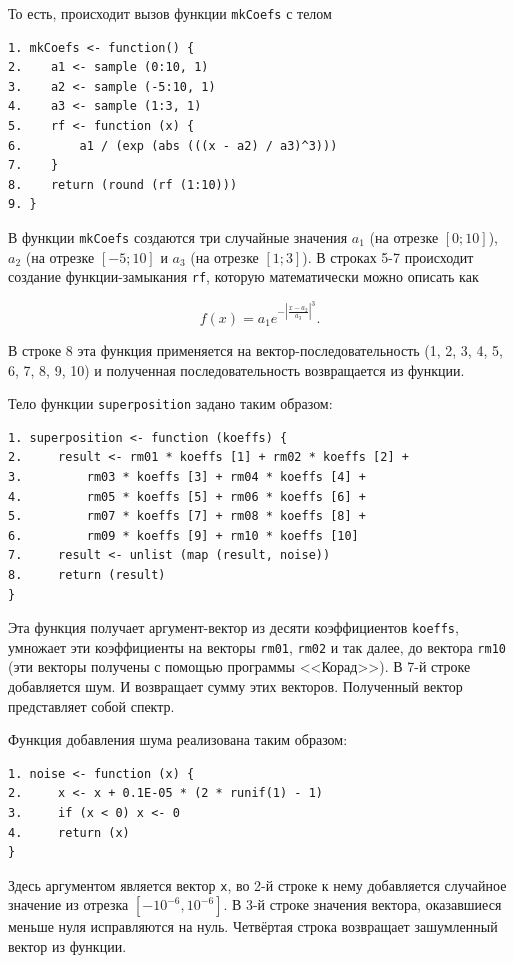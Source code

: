 \documentclass[12pt]{article}
\begin{document}
\begin{enumerate}
  То есть, происходит вызов функции \verb|mkCoefs| с телом

\begin{verbatim}
1. mkCoefs <- function() {
2.    a1 <- sample (0:10, 1)
3.    a2 <- sample (-5:10, 1)
4.    a3 <- sample (1:3, 1)
5.    rf <- function (x) {
6.        a1 / (exp (abs (((x - a2) / a3)^3)))
7.    }
8.    return (round (rf (1:10)))
9. }
\end{verbatim}

  В функции \verb|mkCoefs| создаются три случайные значения $a_1$ (на отрезке $[0; 10]$), $a_2$ (на отрезке $[-5; 10]$ и $a_3$ (на отрезке $[1;3]$). В строках 5-7 происходит создание функции-замыкания \verb|rf|, которую математически можно описать как

  $$f(x) = a_1 e^{- \left | {\frac {x - a_2} {a_3}} \right |^3}.$$

  В строке 8 эта функция применяется на вектор-последовательность (1, 2, 3, 4, 5, 6, 7, 8, 9, 10) и полученная последовательность возвращается из функции.

  Тело функции \verb|superposition| задано таким образом:

\begin{verbatim}
1. superposition <- function (koeffs) {
2.     result <- rm01 * koeffs [1] + rm02 * koeffs [2] +
3.         rm03 * koeffs [3] + rm04 * koeffs [4] +
4.         rm05 * koeffs [5] + rm06 * koeffs [6] +
5.         rm07 * koeffs [7] + rm08 * koeffs [8] +
6.         rm09 * koeffs [9] + rm10 * koeffs [10]
7.     result <- unlist (map (result, noise))
8.     return (result)
}
\end{verbatim}

  Эта функция получает аргумент-вектор из десяти коэффициентов \verb|koeffs|, умножает эти коэффициенты на векторы \verb|rm01|, \verb|rm02| и так далее, до вектора \verb|rm10| (эти векторы получены с помощью программы <<Корад>>). В 7-й строке добавляется шум. И возвращает сумму этих векторов. Полученный вектор представляет собой спектр.

  Функция добавления шума реализована таким образом:

\begin{verbatim}
1. noise <- function (x) {
2.     x <- x + 0.1E-05 * (2 * runif(1) - 1)
3.     if (x < 0) x <- 0
4.     return (x)
}
\end{verbatim}

  Здесь аргументом является вектор \verb|x|, во 2-й строке к нему добавляется случайное значение из отрезка $[-10^{-6}, 10^{-6}]$. В 3-й строке значения вектора, оказавшиеся меньше нуля исправляются на нуль. Четвёртая строка возвращает зашумленный вектор из функции.
  

\end{enumerate}
\end{document}
